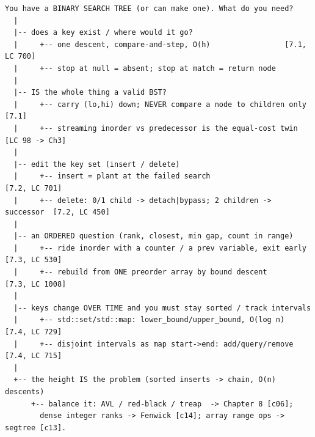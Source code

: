 \begin{lstlisting}[language={}, basicstyle=\ttfamily\small, numbers=none, frame=single]
  You have a BINARY SEARCH TREE (or can make one). What do you need?
  |
  |-- does a key exist / where would it go?
  |     +-- one descent, compare-and-step, O(h)                 [7.1, LC 700]
  |     +-- stop at null = absent; stop at match = return node
  |
  |-- IS the whole thing a valid BST?
  |     +-- carry (lo,hi) down; NEVER compare a node to children only   [7.1]
  |     +-- streaming inorder vs predecessor is the equal-cost twin      [LC 98 -> Ch3]
  |
  |-- edit the key set (insert / delete)
  |     +-- insert = plant at the failed search                          [7.2, LC 701]
  |     +-- delete: 0/1 child -> detach|bypass; 2 children -> successor  [7.2, LC 450]
  |
  |-- an ORDERED question (rank, closest, min gap, count in range)
  |     +-- ride inorder with a counter / a prev variable, exit early    [7.3, LC 530]
  |     +-- rebuild from ONE preorder array by bound descent             [7.3, LC 1008]
  |
  |-- keys change OVER TIME and you must stay sorted / track intervals
  |     +-- std::set/std::map: lower_bound/upper_bound, O(log n)          [7.4, LC 729]
  |     +-- disjoint intervals as map start->end: add/query/remove       [7.4, LC 715]
  |
  +-- the height IS the problem (sorted inserts -> chain, O(n) descents)
      +-- balance it: AVL / red-black / treap  -> Chapter 8 [c06];
        dense integer ranks -> Fenwick [c14]; array range ops -> segtree [c13].
\end{lstlisting}


